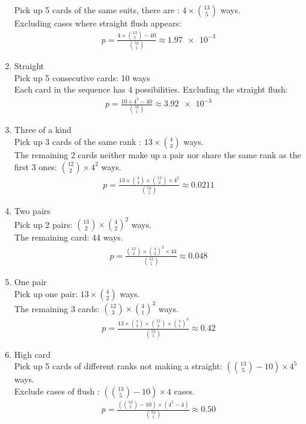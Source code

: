 \documentclass[a4paper]{article}
\begin{document}
\begin{enumerate}
	      Pick up 5 cards of the same suits, there are : $4 \times{13\choose 5}$ ways. \\
	      Excluding cases where straight flush appears: 
	      \begin{align*}
		      p = \frac{4 \times {13 \choose 5} - 40}{{52 \choose 5}} \approx \num{1.97e-3}
	      \end{align*}
	\item Straight \\
	      Pick up 5 consecutive cards: 10 ways\\
	      Each card in the sequence has 4 possibilities. Excluding the straight flush:\\
	      \begin{align*}
		      p = \frac{10 \times 4^{5} - 40 }{{52 \choose 5}} \approx \num{3.92e-3}
	      \end{align*}
	\item Three of a kind \\
	      Pick up 3 cards of the same rank : $13\times {4 \choose 3}$ ways. \\
	      The remaining 2 cards neither make up a pair nor share the same rank as the first 3 ones: ${12\choose 2} \times 4^{2}$ ways.
	      \begin{align*}
		      p = \frac{13\times {4 \choose 3}\times{12 \choose 2}\times 4^{2} }{{52\choose 5}} \approx 0.0211
	      \end{align*}
	\item Two pairs\\
	      Pick up 2 pairs: ${13 \choose 2}\times {4 \choose 2}^{2}$ ways. \\
	      The remaining card: 44 ways. \\
	      \begin{align*}
		      p = \frac{{13 \choose 2}\times {4 \choose 2}^{2} \times 44}{{52 \choose 5}} \approx 0.048
	      \end{align*}
	\item One pair\\
	      Pick up one pair: $13 \times {4 \choose 2}$ ways. \\
	      The remaining 3 cards: ${12 \choose 3} \times {4 \choose 1}^{3}$ ways. \\
	      \begin{align*}
		      p = \frac{13 \times {4 \choose 2} \times {12 \choose 3} \times {4 \choose 1}^{3}}{{52 \choose 5}} \approx 0.42
	      \end{align*}
	\item High card \\
	      Pick up 5 cards of different ranks not making a straight: $({13 \choose 5}-10)\times 4^{5}$ ways. \\
	      Exclude cases of flush : $({13 \choose 5}-10)\times 4$ cases. \\
	      \begin{align*}
		      p = \frac{({13 \choose 5}-10)\times (4^{5}-4)}{{52 \choose 5}} \approx 0.50
	      \end{align*}
\end{enumerate}
\end{document}
